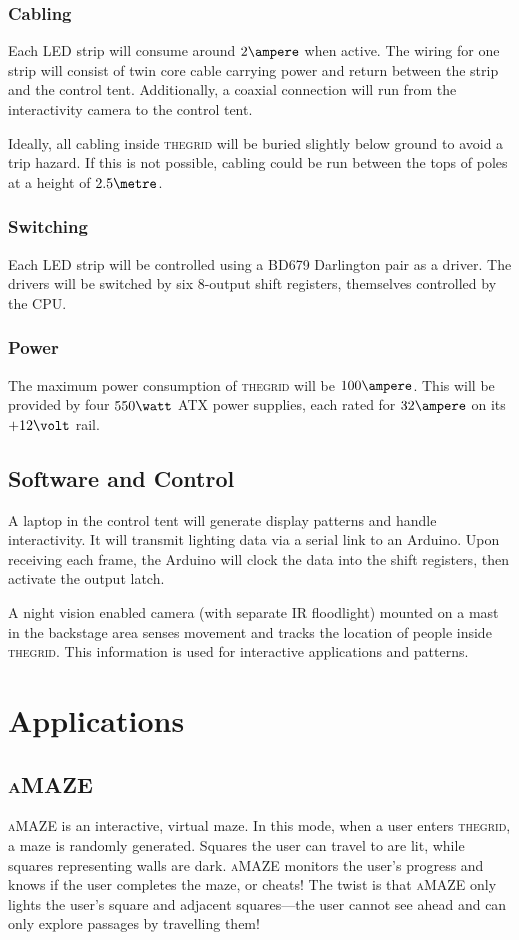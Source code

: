 \documentclass[12pt]{article} %
\newcommand{\thegrid}{\textsc{the\textperiodcentered grid}\xspace}
\newcommand{\amaze}{\textsc{aMAZE}\xspace}
\begin{document}
\subsubsection{Cabling}
Each LED strip will consume around $2\ampere$ when active.  The wiring for one strip will consist of twin core cable carrying power and return between the strip and the control tent.  Additionally, a coaxial connection will run from the interactivity camera to the control tent.

Ideally, all cabling inside \thegrid will be buried slightly below ground to avoid a trip hazard.  If this is not possible, cabling could be run between the tops of poles at a height of $2.5\metre$.

\subsubsection{Switching}
Each LED strip will be controlled using a BD679 Darlington pair as a driver.  The drivers will be switched by six 8-output shift registers, themselves controlled by the CPU.

\subsubsection{Power}
The maximum power consumption of \thegrid will be $100\ampere$.  This will be provided by four $550\watt$ ATX power supplies, each rated for $32\ampere$ on its $+12\volt$ rail.

\subsection{Software and Control}
A laptop in the control tent will generate display patterns and handle interactivity.  It will transmit lighting data via a serial link to an Arduino.  Upon receiving each frame, the Arduino will clock the data into the shift registers, then activate the output latch.

A night vision enabled camera (with separate IR floodlight) mounted on a mast in the backstage area senses movement and tracks the location of people inside \thegrid.  This information is used for interactive applications and patterns.

\section{Applications}
\subsection{\amaze}
\amaze is an interactive, virtual maze.  In this mode, when a user enters \thegrid, a maze is randomly generated.  Squares the user can travel to are lit, while squares representing walls are dark.  \amaze monitors the user's progress and knows if the user completes the maze, or cheats!  The twist is that \amaze only lights the user's square and adjacent squares---the user cannot see ahead and can only explore passages by travelling them!
\end{document}
